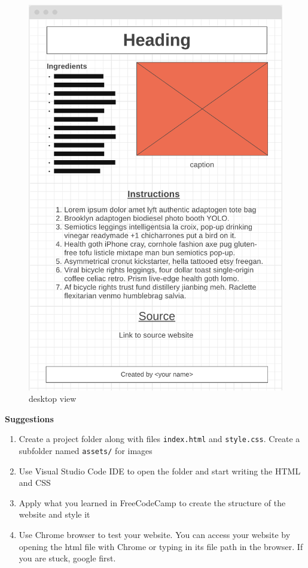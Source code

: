 \documentclass{42-en}
\begin{document}
\begin{figure}[H]
    \begin{center}
        \includegraphics[width=14cm]{wireframe.png}\\
        desktop view
    \end{center}
\end{figure}
\textbf{Suggestions}
\begin{enumerate}
    \item Create a project folder along with files \texttt{index.html} and \texttt{style.css}. Create a subfolder named \texttt{assets/} for images
    \item Use Visual Studio Code IDE to open the folder and start writing the HTML and CSS
    \item Apply what you learned in FreeCodeCamp to create the structure of the website and style it
    \item Use Chrome browser to test your website. You can access your website by opening the html file with Chrome or typing in its file path in the browser. If you are stuck, google first.
\end{enumerate}
\end{document}
